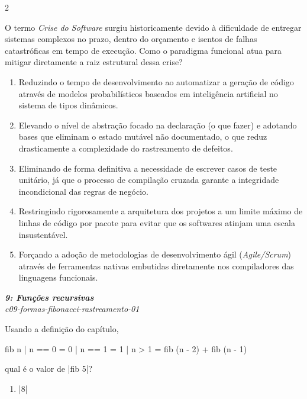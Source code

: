 \documentclass[a4paper,10pt,brazil]{article}
\begin{document}
\begin{multicols}{2}
\begin{flushright}
\end{flushright}
O termo \emph{Crise do Software} surgiu historicamente devido à dificuldade de entregar sistemas complexos no prazo, dentro do orçamento e isentos de falhas catastróficas em tempo de execução. Como o paradigma funcional atua para mitigar diretamente a raiz estrutural dessa crise?

\begin{enumerate}
  \item Reduzindo o tempo de desenvolvimento ao automatizar a geração de código através de modelos probabilísticos baseados em inteligência artificial no sistema de tipos dinâmicos.

  \item Elevando o nível de abstração focado na declaração (o que fazer) e adotando bases que eliminam o estado mutável não documentado, o que reduz drasticamente a complexidade do rastreamento de defeitos.

  \item Eliminando de forma definitiva a necessidade de escrever casos de teste unitário, já que o processo de compilação cruzada garante a integridade incondicional das regras de negócio.

  \item Restringindo rigorosamente a arquitetura dos projetos a um limite máximo de linhas de código por pacote para evitar que os softwares atinjam uma escala insustentável.

  \item Forçando a adoção de metodologias de desenvolvimento ágil (\emph{Agile/Scrum}) através de ferramentas nativas embutidas diretamente nos compiladores das linguagens funcionais.


\end{enumerate}

\begin{flushright}
  \footnotesize
  \textit{\textbf{9: Funções recursivas}}\\
  \textit{c09-formas-fibonacci-rastreamento-01}\\

\end{flushright}
Usando a definição do capítulo,
\begin{haskellcode}
fib n
  | n == 0 = 0
  | n == 1 = 1
  | n > 1  = fib (n - 2) + fib (n - 1)
\end{haskellcode}
qual é o valor de \haskellinline|fib 5|?

\begin{enumerate}
  \item \haskellinline|8|


\end{enumerate}
\end{multicols}
\end{document}
